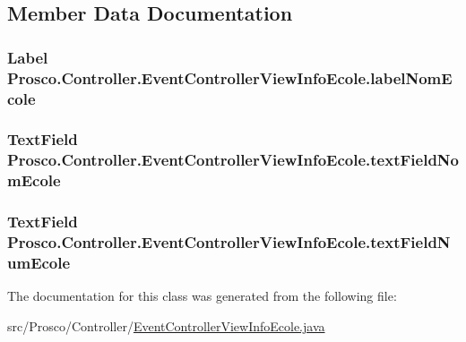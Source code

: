 \subsection{Member Data Documentation}
\hypertarget{class_prosco_1_1_controller_1_1_event_controller_view_info_ecole_a1710c5a302a88e65a37b6aacc0734ec8}{
\subsubsection[{label\-Nom\-Ecole}]{\setlength{\rightskip}{0pt plus 5cm}Label Prosco.\-Controller.\-Event\-Controller\-View\-Info\-Ecole.\-label\-Nom\-Ecole}}\label{class_prosco_1_1_controller_1_1_event_controller_view_info_ecole_a1710c5a302a88e65a37b6aacc0734ec8}
\hypertarget{class_prosco_1_1_controller_1_1_event_controller_view_info_ecole_a09b2fd3c5664a9eef434358aca15be79}{
\subsubsection[{text\-Field\-Nom\-Ecole}]{\setlength{\rightskip}{0pt plus 5cm}Text\-Field Prosco.\-Controller.\-Event\-Controller\-View\-Info\-Ecole.\-text\-Field\-Nom\-Ecole}}\label{class_prosco_1_1_controller_1_1_event_controller_view_info_ecole_a09b2fd3c5664a9eef434358aca15be79}
\hypertarget{class_prosco_1_1_controller_1_1_event_controller_view_info_ecole_ad6c7a8611ef1f212d8540b3f24982466}{
\subsubsection[{text\-Field\-Num\-Ecole}]{\setlength{\rightskip}{0pt plus 5cm}Text\-Field Prosco.\-Controller.\-Event\-Controller\-View\-Info\-Ecole.\-text\-Field\-Num\-Ecole}}\label{class_prosco_1_1_controller_1_1_event_controller_view_info_ecole_ad6c7a8611ef1f212d8540b3f24982466}


The documentation for this class was generated from the following file\-:\begin{DoxyCompactItemize}
\item 
src/\-Prosco/\-Controller/\hyperlink{_event_controller_view_info_ecole_8java}{Event\-Controller\-View\-Info\-Ecole.\-java}\end{DoxyCompactItemize}
